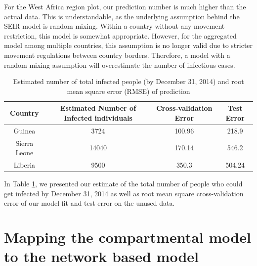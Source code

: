 \documentclass[10pt, journal,onecolumn]{IEEEtran}
\begin{document}
For the West Africa region plot, our prediction number is much higher than the actual data. This is understandable, as the underlying assumption behind the SEIR model is random mixing.  Within a country without any movement restriction, this model is somewhat appropriate. However, for the aggregated model among multiple countries, this assumption is no longer valid due to stricter movement regulations between country borders. Therefore, a model with a random mixing assumption will overestimate the number of infectious cases.


\begin{table}[h]
\caption{Estimated number of total infected people (by December 31, 2014) and root mean square error (RMSE) of prediction} 
\centering
\begin{tabular}{|c|c|c|c|}
\hline 
Country & Estimated Number of Infected individuals & Cross-validation Error & Test Error 
\tabularnewline
\hline 
\hline 
Guinea & 3724 & 100.96 & 218.9\tabularnewline
\hline 
Sierra Leone & 14040 & 170.14 & 546.2\tabularnewline
\hline 
Liberia & 9500 & 350.3 & 504.24\tabularnewline
\hline 
\end{tabular}
\label{Tb:prediction}

\end{table}

In Table \ref{Tb:prediction}, we presented our estimate of the total number of people who could get infected by December 31, 2014 as well as root mean square cross-validation error of our model fit and test error on the unused data. 





\section{Mapping the compartmental model to the network based model}
\end{document}
